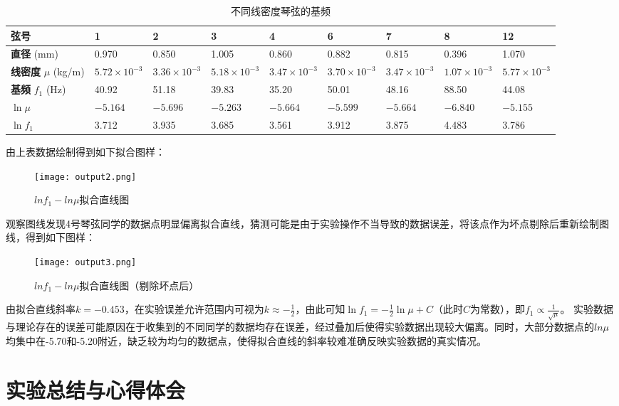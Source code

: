 \documentclass[UTF-8,twoside,cs4size]{ctexart}
\begin{document}
\begin{table}[!h]
    \centering
    \renewcommand\arraystretch{1.5}
    \caption{不同线密度琴弦的基频}
    \begin{tabularx}{\textwidth}{|Y|Y|Y|Y|Y|Y|Y|Y|Y|}
        \hline
        \textbf{弦号} & 1 & 2 & 3 & 4 & 6 & 7 & 8 & 12 \\
        \hline
        \textbf{直径} (mm) & 0.970 & 0.850 & 1.005 & 0.860 & 0.882 & 0.815 & 0.396 & 1.070 \\
        \hline
        \textbf{线密度} $\mu$ (kg/m) & $5.72 \times 10^{-3}$ & $3.36 \times 10^{-3}$ & $5.18 \times 10^{-3}$ & $3.47 \times 10^{-3}$ & $3.70 \times 10^{-3}$ & $3.47 \times 10^{-3}$ & $1.07 \times 10^{-3}$ & $5.77 \times 10^{-3}$ \\
        \hline
        \textbf{基频} $f_1$ (Hz) & 40.92 & 51.18 & 39.83 & 35.20 & 50.01 & 48.16 & 88.50 & 44.08 \\
        \hline
        $\ln \mu$ & $-5.164$ & $-5.696$ & $-5.263$ & $-5.664$ & $-5.599$ & $-5.664$ & $-6.840$ & $-5.155$ \\
        \hline
        $\ln f_1$ & 3.712 & 3.935 & 3.685 & 3.561 & 3.912 & 3.875 & 4.483 & 3.786 \\
        \hline
    \end{tabularx}
\end{table}
由上表数据绘制得到如下拟合图样：
\begin{figure}[!h]
    \centering
    \texttt{[image: output2.png]}
    \caption{$lnf_1 - ln\mu$拟合直线图}
\end{figure}
观察图线发现4号琴弦同学的数据点明显偏离拟合直线，猜测可能是由于实验操作不当导致的数据误差，将该点作为坏点剔除后重新绘制图线，得到如下图样：
\newpage
\begin{figure}[!h]
    \centering
    \texttt{[image: output3.png]}
    \caption{$lnf_1 - ln\mu$拟合直线图（剔除坏点后）}
\end{figure}
由拟合直线斜率$ k=-0.453$，在实验误差允许范围内可视为$k \approx -\frac{1}{2}$，由此可知$ \ln f_1=-\frac12\ln\mu+C $（此时$ C $为常数），即$ f_1\propto\frac{1}{\sqrt \mu} $。
实验数据与理论存在的误差可能原因在于收集到的不同同学的数据均存在误差，经过叠加后使得实验数据出现较大偏离。同时，大部分数据点的$ln \mu$均集中在-5.70和-5.20附近，缺乏较为均匀的数据点，使得拟合直线的斜率较难准确反映实验数据的真实情况。

\section{实验总结与心得体会}
\end{document}
